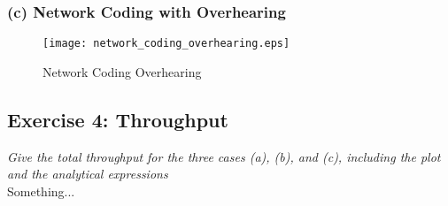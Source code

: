 \subsubsection{(c) Network Coding with Overhearing}
\begin{figure}[!h]
  \centering
  \texttt{[image: network\_coding\_overhearing.eps]}
  \caption{Network Coding Overhearing}
  \label{fig:network_coding_overhearing}
\end{figure}

\subsection{Exercise 4: Throughput}
\textit{Give the total throughput for the three cases (a), (b), and (c), including the plot and the analytical expressions}\\

Something...